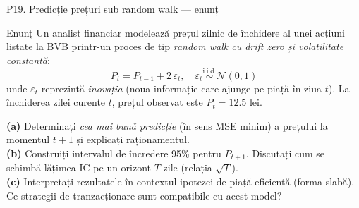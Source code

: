 \documentclass[9pt, aspectratio=169, t]{beamer}
\begin{document}
\begin{frame}{P19. Predicție prețuri sub random walk --- enunț}
\begin{block}{Enunț}
Un analist financiar modelează prețul zilnic de închidere al unei acțiuni listate la BVB printr-un proces de tip \emph{random walk cu drift zero și volatilitate constantă}:
\[
P_t = P_{t-1} + 2\,\varepsilon_t,\quad \varepsilon_t \overset{\text{i.i.d.}}{\sim} \mathcal N(0,1)
\]
unde $\varepsilon_t$ reprezintă \emph{inovația} (noua informație care ajunge pe piață în ziua $t$). La închiderea zilei curente $t$, prețul observat este $P_t = 12.5$ lei.

\textbf{(a)} Determinați \emph{cea mai bună predicție} (în sens MSE minim) a prețului la momentul $t+1$ și explicați raționamentul.\\
\textbf{(b)} Construiți intervalul de încredere 95\% pentru $P_{t+1}$. Discutați cum se schimbă lățimea IC pe un orizont $T$ zile (relația $\sqrt T$).\\
\textbf{(c)} Interpretați rezultatele în contextul ipotezei de piață eficientă (forma slabă). Ce strategii de tranzacționare sunt compatibile cu acest model?
\end{block}
\end{frame}
\end{document}
